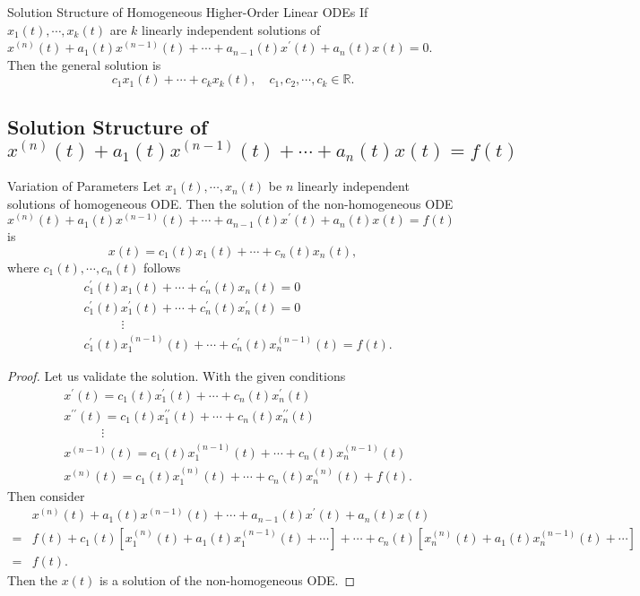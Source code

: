 \begin{proposition}{Solution Structure of Homogeneous Higher-Order Linear ODEs}{}
  If $x_1(t), \cdots, x_k(t)$ are $k$ linearly independent solutions of
  $x^{(n)}(t) + a_1(t)x^{(n-1)}(t) + \cdots + a_{n-1}(t)x^{\prime}(t) + a_n(t)x(t) = 0$.
  Then the general solution is
  \begin{equation}
    c_1x_1(t) + \cdots + c_kx_k(t), \quad c_1,c_2,\cdots,c_k \in \mathbb{R}.
  \end{equation}
\end{proposition}

\subsection{Solution Structure of $x^{(n)}(t) + a_1(t)x^{(n-1)}(t) + \cdots + a_n(t)x(t) = f(t)$}

\begin{proposition}{Variation of Parameters}{}
  Let $x_1(t), \cdots, x_n(t)$ be $n$ linearly independent solutions of homogeneous ODE.
  Then the solution of the non-homogeneous ODE
  $x^{(n)}(t) + a_1(t)x^{(n-1)}(t) + \cdots + a_{n-1}(t)x^{\prime}(t) + a_n(t)x(t) = f(t)$
  is
  \begin{equation}
    x(t) = c_1(t)x_1(t) + \cdots + c_n(t)x_n(t),
  \end{equation}
  where $c_1(t),\cdots,c_n(t)$ follows
  \begin{align}
    & c^{\prime}_1(t)x_1(t) + \cdots + c_n^{\prime}(t)x_n(t) = 0\\
    & c^{\prime}_1(t)x_1^{\prime}(t) + \cdots + c_n^{\prime}(t)x_n^{\prime}(t) = 0\\
    & \quad \quad \quad \vdots\\
    & c^{\prime}_1(t)x_1^{(n-1)}(t) + \cdots +  c_n^{\prime}(t)x_n^{(n-1)}(t) = f(t).
  \end{align}
\end{proposition}

\begin{proof}
  Let us validate the solution. With the given conditions
  \begin{align}
    & x^{\prime}(t) = c_1(t)x^{\prime}_1(t) + \cdots + c_n(t)x^{\prime}_n(t)\\
    & x^{\prime\prime}(t) = c_1(t)x^{\prime\prime}_1(t) + \cdots + c_n(t)x_n^{\prime\prime}(t)\\
    & \quad \quad \quad \vdots\\
    & x^{(n-1)}(t) = c_1(t)x_1^{(n-1)}(t) + \cdots + c_n(t) x_n^{(n-1)}(t)\\
    & x^{(n)}(t) = c_1(t)x_1^{(n)}(t) + \cdots + c_n(t) x_n^{(n)}(t) + f(t).
  \end{align}
  Then consider
  \begin{align}
    &x^{(n)}(t) + a_1(t)x^{(n-1)}(t) + \cdots + a_{n-1}(t)x^{\prime}(t) + a_n(t)x(t)\\
    =& f(t) + c_1(t)[x_1^{(n)}(t) + a_1(t) x_1^{(n-1)}(t) + \cdots] + \cdots + c_n(t)[x_n^{(n)}(t) + a_1(t)x_n^{(n-1)}(t) + \cdots]\\
    =& f(t).
  \end{align}
  Then the $x(t)$ is a solution of the non-homogeneous ODE.
\end{proof}

